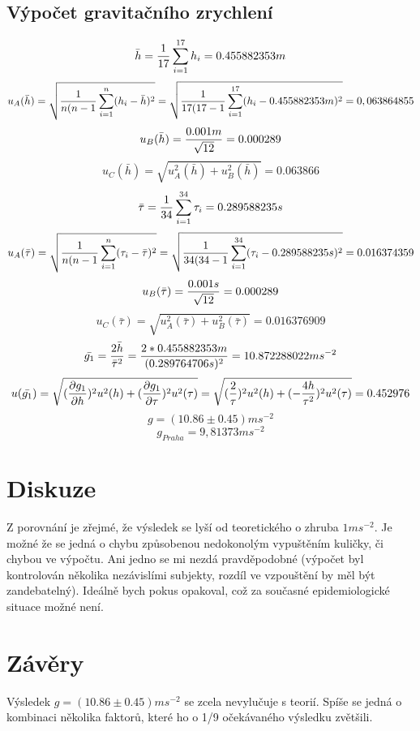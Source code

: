 \documentclass[titlepage]{article}
\begin{document}
		\subsection{Výpočet gravitačního zrychlení}
		$$ \bar{h} = {1 \over 17 }\sum_{i=1}^{17}h_i = 0.455882353m$$
		$$ u_A(\bar{h}) = \sqrt{{1 \over n(n-1}\sum_{i=1}^{n}(h_i-\bar{h})^2} = \sqrt{{1 \over 17(17-1}\sum_{i=1}^{17}(h_i-0.455882353m)^2} = 0,063864855$$
		$$ u_B(\bar{h}) = {0.001m \over \sqrt{12}} = 0.000289 $$
		$$ u_C(\bar{h}) = \sqrt{u_A^2(\bar{h})+u_B^2(\bar{h})} = 0.063866 $$
		\vspace{30pt}
		$$ \bar{\tau} = {1 \over 34}\sum_{i=1}^{34}\tau_{i} = 0.289588235s$$
		$$ u_A(\bar{\tau}) = \sqrt{{1 \over n(n-1}\sum_{i=1}^{n}(\tau_{i}-\bar{\tau})^2} = \sqrt{{1 \over 34(34-1}\sum_{i=1}^{34}(\tau_{i}-0.289588235s)^2} = 0.016374359$$
		$$ u_B(\bar{\tau}) = {0.001s \over \sqrt{12}} = 0.000289 $$
		$$ u_C(\bar{\tau}) = \sqrt{u_A^2(\bar{\tau})+u_B^2(\bar{\tau})} = 0.016376909 $$
		\vspace{30pt}
		$$ \bar{g_1} = {2\bar{h} \over \bar{\tau}^2} = {2*0.455882353m \over (0.289764706s)^2} = 10.872288022 ms^{-2}$$
		$$ u(\bar{g_1}) = \sqrt{({\partial{g_1} \over \partial{h}})^2u^2(h)+({\partial{g_1} \over \partial{\tau}})^2u^2(\tau)} = \sqrt{({2 \over \tau})^2u^2(h)+(-{4h \over \tau^2})^2u^2(\tau)} = 0.452976$$
		$$g = (10.86 \pm 0.45)ms^{-2}$$
		$$g_{Praha} = 9,81373 ms^{-2}$$
	\section{Diskuze}
		Z porovnání je zřejmé, že výsledek se lyší od teoretického o zhruba $1ms^{-2}$. Je možné že se jedná o chybu způsobenou nedokonolým vypuštěním kuličky, či chybou ve výpočtu. Ani jedno se mi nezdá pravděpodobné (výpočet byl kontrolován několika nezávislími subjekty, rozdíl ve vzpouštění by měl být zandebatelný). Ideálně bych pokus opakoval, což za současné epidemiologické situace možné není.
	\section{Závěry}
		Výsledek $g = (10.86 \pm 0.45)ms^{-2}$ se zcela nevylučuje s teorií. Spíše se jedná o kombinaci několika faktorů, které ho o 1/9 očekávaného výsledku zvětšili.
\end{document}

